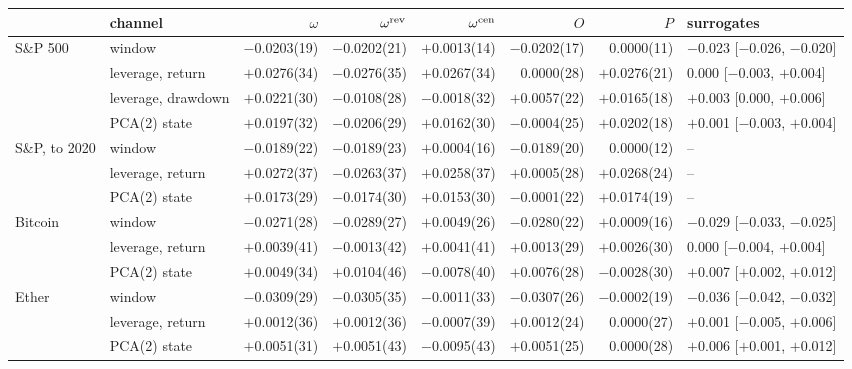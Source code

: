 \begin{ruledtabular}
\begin{tabular}{llrrrrrl}
 & channel & $\omega$ & $\omega^{\rm rev}$ & $\omega^{\rm cen}$ & $O$ & $P$ & surrogates\\
\hline
S\&P 500 & window & $-$0.0203(19) & $-$0.0202(21) & $+$0.0013(14) & $-$0.0202(17) & 0.0000(11) & $-$0.023 [$-$0.026, $-$0.020]\\
 & leverage, return & $+$0.0276(34) & $-$0.0276(35) & $+$0.0267(34) & 0.0000(28) & $+$0.0276(21) & 0.000 [$-$0.003, $+$0.004]\\
 & leverage, drawdown & $+$0.0221(30) & $-$0.0108(28) & $-$0.0018(32) & $+$0.0057(22) & $+$0.0165(18) & $+$0.003 [0.000, $+$0.006]\\
 & PCA(2) state & $+$0.0197(32) & $-$0.0206(29) & $+$0.0162(30) & $-$0.0004(25) & $+$0.0202(18) & $+$0.001 [$-$0.003, $+$0.004]\\
\hline
S\&P, to 2020 & window & $-$0.0189(22) & $-$0.0189(23) & $+$0.0004(16) & $-$0.0189(20) & 0.0000(12) & --\\
 & leverage, return & $+$0.0272(37) & $-$0.0263(37) & $+$0.0258(37) & $+$0.0005(28) & $+$0.0268(24) & --\\
 & PCA(2) state & $+$0.0173(29) & $-$0.0174(30) & $+$0.0153(30) & $-$0.0001(22) & $+$0.0174(19) & --\\
\hline
Bitcoin & window & $-$0.0271(28) & $-$0.0289(27) & $+$0.0049(26) & $-$0.0280(22) & $+$0.0009(16) & $-$0.029 [$-$0.033, $-$0.025]\\
 & leverage, return & $+$0.0039(41) & $-$0.0013(42) & $+$0.0041(41) & $+$0.0013(29) & $+$0.0026(30) & 0.000 [$-$0.004, $+$0.004]\\
 & PCA(2) state & $+$0.0049(34) & $+$0.0104(46) & $-$0.0078(40) & $+$0.0076(28) & $-$0.0028(30) & $+$0.007 [$+$0.002, $+$0.012]\\
\hline
Ether & window & $-$0.0309(29) & $-$0.0305(35) & $-$0.0011(33) & $-$0.0307(26) & $-$0.0002(19) & $-$0.036 [$-$0.042, $-$0.032]\\
 & leverage, return & $+$0.0012(36) & $+$0.0012(36) & $-$0.0007(39) & $+$0.0012(24) & 0.0000(27) & $+$0.001 [$-$0.005, $+$0.006]\\
 & PCA(2) state & $+$0.0051(31) & $+$0.0051(43) & $-$0.0095(43) & $+$0.0051(25) & 0.0000(28) & $+$0.006 [$+$0.001, $+$0.012]\\

\end{tabular}
\end{ruledtabular}
